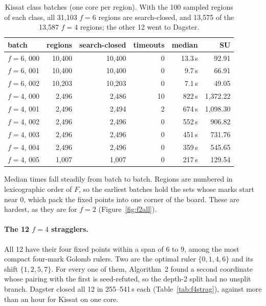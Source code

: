\documentclass[11pt,a4paper]{article}
\theoremstyle{definition}
\begin{document}
\begin{table}[H]
\centering
\begin{tabular}{@{}lrrrrr@{}}
\toprule
batch & regions & search-closed & timeouts & median & SU \\
\midrule
$f=6$, 000 & 10{,}400 & 10{,}400 & 0 & 13.3\,s & 92.91 \\
$f=6$, 001 & 10{,}400 & 10{,}400 & 0 & 9.7\,s & 66.91 \\
$f=6$, 002 & 10{,}203 & 10{,}203 & 0 & 7.1\,s & 49.05 \\
\midrule
$f=4$, 000 & 2{,}496 & 2{,}486 & 10 & 822\,s & 1{,}372.22 \\
$f=4$, 001 & 2{,}496 & 2{,}494 & 2 & 674\,s & 1{,}098.30 \\
$f=4$, 002 & 2{,}496 & 2{,}496 & 0 & 552\,s & 906.82 \\
$f=4$, 003 & 2{,}496 & 2{,}496 & 0 & 451\,s & 731.76 \\
$f=4$, 004 & 2{,}496 & 2{,}496 & 0 & 359\,s & 545.65 \\
$f=4$, 005 & 1{,}007 & 1{,}007 & 0 & 217\,s & 129.54 \\
\bottomrule
\end{tabular}
\caption{Kissat class batches (one core per region). With the 100 sampled regions of each
class, all 31{,}103 $f=6$ regions are search-closed, and 13{,}575 of the 13{,}587 $f=4$
regions; the other 12 went to Dagster.}
\label{tab:bulk}
\end{table}

Median times fall steadily from batch to batch. Regions are numbered in lexicographic order of
$F$, so the earliest batches hold the sets whose marks start near 0, which pack the fixed
points into one corner of the board. These are hardest, as they are for $f=2$
(Figure~\ref{fig:f2all}).

\paragraph{The 12 $f=4$ stragglers.} All 12 have their four fixed points within a span of 6 to
9, among the most compact four-mark Golomb rulers. Two are the optimal ruler $\{0,1,4,6\}$
and its shift $\{1,2,5,7\}$. For every one of them, Algorithm~2 found a second coordinate whose
pairing with the first is seed-refuted, so the depth-2 split had no unsplit branch. Dagster
closed all 12 in 255--541\,s each (Table~\ref{tab:f4strag}), against more than an hour for
Kissat on one core.
\end{document}
